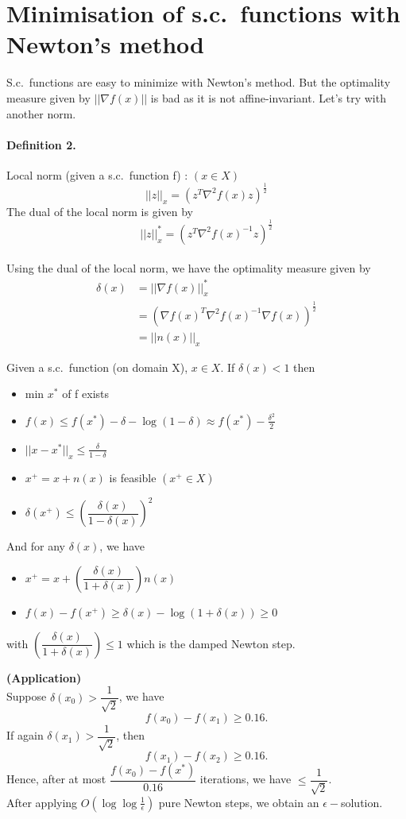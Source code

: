 \section{Minimisation of s.c.\ functions with Newton's method}
S.c.\ functions are easy to minimize with Newton's method. But the optimality measure given by $\left|| \nabla f(x) \right||$ is bad as it is not affine-invariant. Let's try with another norm.
\paragraph{Definition 2.} Local norm (given a s.c.\ function f) : $(x \in X)$ 
$$
||z||_x  = (z^T \nabla^2f(x)z)^{\frac{1}{2}}
$$
The dual of the local norm is given by
$$
||z||^*_x  = (z^T \nabla^2f(x)^{-1}z)^{\frac{1}{2}}
$$
\\
Using the dual of the local norm, we have the optimality measure given by
\begin{align*}
\delta(x) &= ||\nabla f(x)||^*_x \\
& = (\nabla f(x)^T \nabla^2f(x)^{-1}\nabla f(x))^{\frac{1}{2}} \\
&= ||n(x)||_x
\end{align*}

\begin{property}
Given a s.c.\ function (on domain X), $x\in X$. If $\delta(x) < 1$ then 
\begin{itemize}
\item min $x^*$ of f exists
\item $f(x) \leq f(x^*) - \delta - \log{(1-\delta)} \approx f(x^*) - \frac{\delta^2}{2}$
\item $||x-x^*||_x \leq \frac{\delta}{1 - \delta} $
\item $x^+ = x + n(x)$ is feasible $(x^+ \in X)$
\item $\delta(x^+) \leq \left(\dfrac{\delta(x)}{1-\delta(x)}\right)^2 $\\
\end{itemize}
And for any $\delta(x)$, we have 
\begin{itemize}
\item $x^+ = x + \left(\dfrac{\delta(x)}{1+\delta(x)}\right)n(x) $
\item $f(x) - f(x^+) \geq \delta(x) - \log{(1+\delta(x))} \geq 0 $
\end{itemize}
with $\left(\dfrac{\delta(x)}{1+\delta(x)}\right) \le 1$ which is the damped Newton step.
\end{property}

\begin{example}
\begin{leftbar}
\textbf{(Application)}\\ 
Suppose $\delta(x_0) > \dfrac{1}{\sqrt{2}}$, we have $$f(x_0) - f(x_1) \geq 0.16.$$ 
If again $\delta(x_1) > \dfrac{1}{\sqrt{2}}$, then $$f(x_1) - f(x_2) \geq 0.16.$$ Hence, after at most $\dfrac{f(x_0) - f(x^*)}{0.16}$ iterations, we have $\leq \dfrac{1}{\sqrt{2}}$. \\
After applying $O(\log{\log{\frac{1}{\epsilon}}})$ pure Newton steps, we obtain an $\epsilon-$solution.
\end{leftbar}
\end{example}

%
